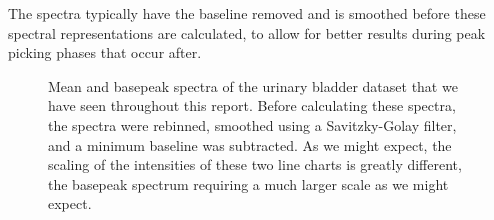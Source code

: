 \documentclass[11pt,openany]{book}
\begin{document}
The spectra typically have the baseline removed and is smoothed before these spectral representations are calculated, to allow for better results during peak picking phases that occur after.

\begin{figure}[H]
    \centering
    
    \caption{Mean and basepeak spectra of the urinary bladder dataset \cite{imzml.org} that we have seen throughout this report. Before calculating these spectra, the spectra were rebinned, smoothed using a Savitzky-Golay filter, and a minimum baseline was subtracted. As we might expect, the scaling of the intensities of these two line charts is greatly different, the basepeak spectrum requiring a much larger scale as we might expect.}
    \label{fig:mean_basepeak_spectra}
\end{figure}
\end{document}
